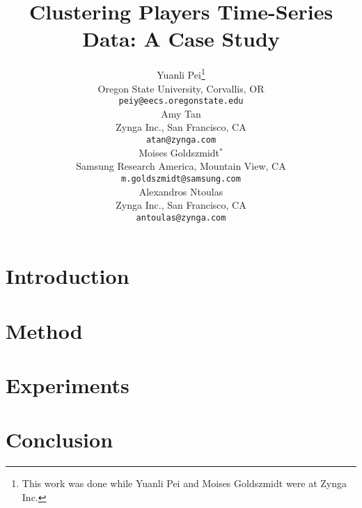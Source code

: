 \documentclass{article} %
\title{Clustering Players Time-Series Data: A Case Study}
\author{
Yuanli Pei\thanks{This work was done while Yuanli Pei and Moises Goldszmidt were at Zynga Inc.} \\
Oregon State University, Corvallis, OR\\
\texttt{peiy@eecs.oregonstate.edu} \\
\And
Amy Tan\\
Zynga Inc., San Francisco, CA\\
\texttt{atan@zynga.com} \\
\AND
Moises Goldszmidt$^\ast$ \\
Samsung Research America, Mountain View, CA \\
\texttt{m.goldszmidt@samsung.com} \\
\And
Alexandros Ntoulas\\
Zynga Inc., San Francisco, CA \\
\texttt{antoulas@zynga.com} 
}
\begin{document}
\maketitle

\begin{abstract}
%

\end{abstract}


\section{Introduction}
%


%

\section{Method}


\section{Experiments}


\section{Conclusion}




\small{
    {}
    
}



\end{document}
